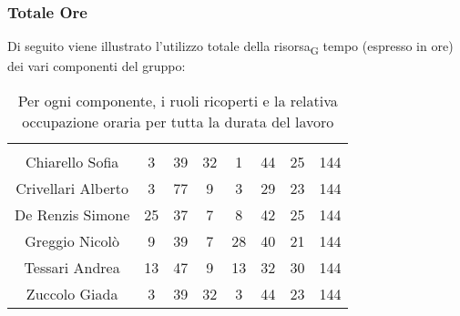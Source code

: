 \subsubsection{Totale Ore}
Di seguito viene illustrato l'utilizzo totale della \gls{risorsa}\textsubscript{G} tempo (espresso in ore) dei vari componenti del gruppo:

\begin{table}[H]
	\begin{center}
		\begin{tabular}{c
				!{\color[HTML]{9b240a}\vrule width 1pt}
				cccccc
				!{\color[HTML]{9b240a}\vrule width 1pt}	
				c}
			\rowcolorhead
			 &  &  &  &  &  &  &  \\
			
			Chiarello Sofia & 3 & 39 & 32 & 1 & 44 & 25 & 144\\
			Crivellari Alberto & 3 & 77 & 9 & 3 & 29 & 23 & 144\\
			De Renzis Simone & 25 & 37 & 7 & 8 & 42 & 25 & 144\\
			Greggio Nicolò & 9 & 39 & 7 & 28 & 40 & 21 & 144\\
			Tessari Andrea & 13 & 47 & 9 & 13 & 32 & 30 & 144\\
			Zuccolo Giada & 3 & 39 & 32 & 3 & 44 & 23 & 144\\
		\end{tabular}
		\caption[Occupazione oraria totale]{Per ogni componente, i ruoli ricoperti e la relativa occupazione oraria per tutta la durata del lavoro}
	\end{center}
\end{table}


